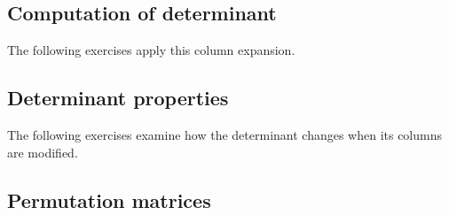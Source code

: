 \subsection{Computation of determinant}
\label{sec:linear-algebra-i:determinant-computation}



The following exercises apply this column expansion.





\subsection{Determinant properties}
\label{sec:linear-algebra-i:determinant-properties}

The following exercises examine how the determinant changes when its
columns are modified.



\newpage
\subsection{Permutation matrices}
\label{sec:linear-algebra-i:permutation-matrices}


